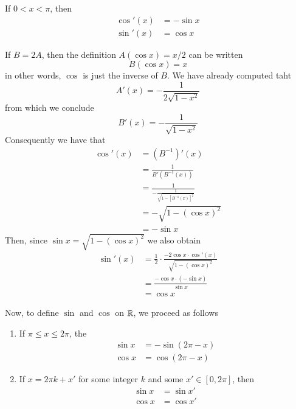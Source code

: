 \documentclass[12pt]{report}
\begin{document}
\begin{subappendices}
    \begin{thm}{}{}
        If $0 < x < \pi$, then \begin{align*}
            \cos'(x) &= -\sin x \\
            \sin'(x) &= \cos x
        \end{align*}
    \end{thm}
    \begin{proof*}{}{}
        If $B = 2A$, then the definition $A(\cos x) = x/2$ can be written \begin{equation*}
            B(\cos x) = x
        \end{equation*}
        in other words, $\cos$ is just the inverse of $B$. We have already computed taht \begin{equation*}
            A'(x) = -\frac{1}{2\sqrt{1-x^2}}
        \end{equation*}
        from which we conclude \begin{equation*}
            B'(x) = -\frac{1}{\sqrt{1-x^2}}
        \end{equation*}
        Consequently we have that \begin{align*}
            \cos'(x) &= (B^{-1})'(x) \\
            &= \frac{1}{B'(B^{-1}(x))} \\
            &= \frac{1}{-\frac{1}{\sqrt{1-[B^{-1}(x)]^2}}} \\
            &= -\sqrt{1-(\cos x)^2} \\
            &= - \sin x
        \end{align*}
        Then, since $\sin x = \sqrt{1-(\cos x)^2}$ we also obtain \begin{align*}
            \sin'(x) &= \frac{1}{2}\cdot \frac{-2\cos x\cdot \cos'(x)}{\sqrt{1-(\cos x)^2}} \\
            &= \frac{-\cos x\cdot (-\sin x)}{\sin x}\\
            &= \cos x
        \end{align*}
    \end{proof*}
    

    \begin{defn}{}{}
        Now, to define $\sin$ and $\cos$ on $\mathbb R$, we proceed as follows \begin{enumerate}
            \item If $\pi \leq x \leq 2\pi$, the \begin{align*}
                    \sin x &= -\sin(2\pi - x) \\
                    \cos x &= \cos(2\pi - x)
                \end{align*}
            \item If $x = 2\pi k+x'$ for some integer $k$ and some $x' \in [0,2\pi]$, then \begin{align*}
                    \sin x &= \sin x' \\
                    \cos x &= \cos x'
            \end{align*}
        \end{enumerate}
    \end{defn}



\end{subappendices}
\end{document}

